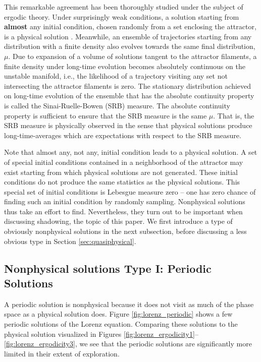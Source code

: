 This remarkable agreement has been thoroughly studied under the subject
of ergodic theory. Under surprisingly weak conditions, a solution starting from
{\bf almost} any initial condition, chosen randomly from a set enclosing the attractor, is a physical solution \cite{young}.   
Meanwhile, an ensemble of trajectories starting from any distribution with a 
finite density also evolves towards the same final distribution, $\mu$. Due to expansion of a volume of solutions tangent to the attractor filaments, a finite density under long-time evolution becomes absolutely continuous on the unstable manifold, i.e., the likelihood of a trajectory visiting any set not intersecting the attractor filaments is zero. The 
stationary distribution achieved on long-time evolution of the ensemble that has the absolute continuity property is called the Sinai-Ruelle-Bowen
(SRB) measure. The absolute continuity property is sufficient to ensure that the SRB measure is the same $\mu.$ That is, the SRB measure is physically observed in the sense that  
 physical solutions produce long-time-averages which are expectations with respect to the SRB measure. 

Note that almost any, not any, initial condition leads to a physical solution. A set of special initial conditions
contained in a neighborhood of the attractor may exist starting from which physical solutions are not generated. These initial conditions do not produce the same statistics as the physical solutions. This special set of initial conditions is Lebesgue measure zero -- one
has zero chance of finding such an initial condition by randomly sampling.
Nonphysical solutions thus take an effort to find.  Nevertheless, they
turn out to be important when discussing shadowing, the topic of this paper.
We first introduce a type of obviously nonphysical solutions in the next
subsection, before discussing a less obvious type in Section \ref{sec:quasiphysical}.

\subsection{Nonphysical solutions Type I: Periodic Solutions}

A periodic solution is nonphysical because it 
does not visit as much
of the phase space as a physical solution does.
Figure \ref{fig:lorenz_periodic} shows
a few periodic solutions of the Lorenz equation. Comparing these solutions
to the physical solution visualized in Figures \ref{fig:lorenz_ergodicity1}--\ref{fig:lorenz_ergodicity3},
we see that the periodic solutions are significantly more limited in their
extent of exploration.

